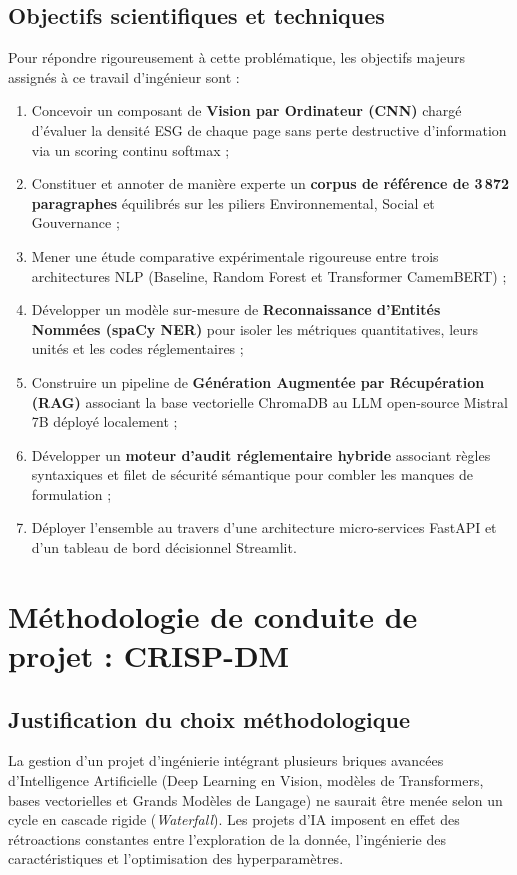 \documentclass[12pt,a4paper]{report}
\begin{document}
\subsection{Objectifs scientifiques et techniques}
Pour répondre rigoureusement à cette problématique, les objectifs majeurs assignés à ce travail d'ingénieur sont :
\begin{enumerate}
    \item Concevoir un composant de \textbf{Vision par Ordinateur (CNN)} chargé d'évaluer la densité ESG de chaque page sans perte destructive d'information via un scoring continu softmax ;
    \item Constituer et annoter de manière experte un \textbf{corpus de référence de 3\,872 paragraphes} équilibrés sur les piliers Environnemental, Social et Gouvernance ;
    \item Mener une étude comparative expérimentale rigoureuse entre trois architectures NLP (Baseline, Random Forest et Transformer CamemBERT) ;
    \item Développer un modèle sur-mesure de \textbf{Reconnaissance d'Entités Nommées (spaCy NER)} pour isoler les métriques quantitatives, leurs unités et les codes réglementaires ;
    \item Construire un pipeline de \textbf{Génération Augmentée par Récupération (RAG)} associant la base vectorielle ChromaDB au LLM open-source Mistral 7B déployé localement ;
    \item Développer un \textbf{moteur d'audit réglementaire hybride} associant règles syntaxiques et filet de sécurité sémantique pour combler les manques de formulation ;
    \item Déployer l'ensemble au travers d'une architecture micro-services FastAPI et d'un tableau de bord décisionnel Streamlit.
\end{enumerate}

\section{Méthodologie de conduite de projet : CRISP-DM}

\subsection{Justification du choix méthodologique}
La gestion d'un projet d'ingénierie intégrant plusieurs briques avancées d'Intelligence Artificielle (Deep Learning en Vision, modèles de Transformers, bases vectorielles et Grands Modèles de Langage) ne saurait être menée selon un cycle en cascade rigide (\textit{Waterfall}). Les projets d'IA imposent en effet des rétroactions constantes entre l'exploration de la donnée, l'ingénierie des caractéristiques et l'optimisation des hyperparamètres.\\
\end{document}
